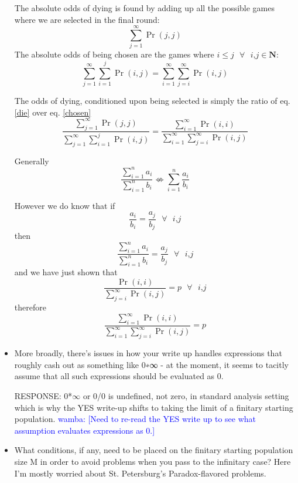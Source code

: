 \documentclass[article,twocolumn]{memoir}
\newcommand{\wamba} [1]{\ifnum\Chatty=1 \textcolor{blue}{wamba:  [#1]} \fi}
\begin{document}
\begin{itemize}
{        The absolute odds of dying is found by adding up all the possible games where we are selected in the final round:
        \begin{equation}
          \sum_{j=1}^{\infty} \Pr(j,j) \label{die}
        \end{equation} 
        The absolute odds of being chosen are the games where  $i\leq j \text{ }\forall \text{ } i\text{,}j \in \mathbf{N}$:
        \begin{equation}
          \sum_{j=1}^{\infty} \sum_{i=1}^{j} \Pr(i,j) = \sum_{i=1}^{\infty} \sum_{j=i}^{\infty} \Pr(i,j) \label{chosen} 
        \end{equation}
        
        The odds of dying, conditioned upon being selected is simply the ratio of eq. \ref{die} over eq. \ref{chosen}
        \begin{equation}
          \frac{\sum_{j=1}^{\infty} \Pr(j,j)}{\sum_{j=1}^{\infty} \sum_{i=1}^{j} \Pr(i,j)} = \frac{\sum_{i=1}^{\infty} \Pr(i,i)}{\sum_{i=1}^{\infty} \sum_{j=i}^{\infty} \Pr(i,j)}\label{theAnswer}
        \end{equation}

        Generally 
            $$\frac{\sum_{i=1}^{n} a_i}{\sum_{i=1}^{n} b_i}\nLeftrightarrow \sum_{i=1}^{n} \frac{a_i}{b_i}$$

        However we do know that if 
            $$\frac{a_i}{b_i}=\frac{a_j}{b_j} \text{   } \forall \text{ } i\text{,}j$$
        then
            $$\frac{\sum_{i=1}^{n} a_i}{\sum_{i=1}^{n} b_i} = \frac{a_j}{b_j}\text{   } \forall \text{ } i\text{,}j$$
        and we have just shown that 
            $$\frac{\Pr(i,i)}{\sum_{j=i}^\infty \Pr(i,j)} = p \text{   } \forall \text{ } i\text{,}j$$
        therefore 
            $$\frac{\sum_{i=1}^{\infty} \Pr(i,i)}{\sum_{i=1}^{\infty} \sum_{j=i}^{\infty} \Pr(i,j)}=p$$
    }


\item More broadly, there’s issues in how your write up handles expressions that roughly cash out as something like 0∗∞ - at the moment, it seems to tacitly assume that all such expressions should be evaluated as 0.
    
    {\color{violet}
        RESPONSE: 
        0*$\infty$ or 0/0 is undefined, not zero, in standard analysis setting which is why the YES write-up shifts to taking the limit of a finitary starting population.
    }
    \wamba{Need to re-read the YES write up to see what assumption evaluates expressions as 0.}
\item What conditions, if any, need to be placed on the finitary starting population size M in order to avoid problems when you pass to the infinitary case? Here I’m mostly worried about St. Petersburg’s Paradox-flavored problems.


\end{itemize}
\end{document}
